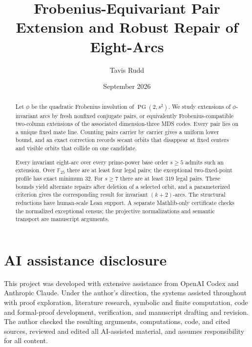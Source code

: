 \documentclass[11pt]{article}
\title{Frobenius-Equivariant Pair Extension and Robust Repair of
Eight-Arcs}
\author{Tavis Rudd}
\date{September 2026}
\theoremstyle{definition}
\theoremstyle{remark}
\newcommand{\PG}{\operatorname{PG}}
\newcommand{\F}{\mathbb{F}}
\begin{document}
\maketitle

\begin{abstract}
Let $\phi$ be the quadratic Frobenius involution of $\PG(2,s^2)$.  We study
extensions of $\phi$-invariant arcs by fresh nonfixed conjugate pairs, or
equivalently Frobenius-compatible two-column extensions of the associated
dimension-three MDS codes.  Every pair lies on a unique fixed mate line.
Counting pairs carrier by carrier gives a uniform lower bound, and an exact
correction records secant orbits that disappear at fixed centers and visible
orbits that collide on one candidate.

Every invariant eight-arc over every prime-power base order $s\ge5$ admits
such an extension.  Over $\F_{25}$ there are at least four legal pairs; the
exceptional two-fixed-point profile has exact minimum $32$.  For $s\ge7$
there are at least $319$ legal pairs.  These bounds yield alternate repairs
after deletion of a selected orbit, and a parameterized criterion gives the
corresponding result for invariant $(k+2)$-arcs.  The structural reductions
have human-scale Lean support.  A separate Mathlib-only certificate checks
the normalized exceptional census; the projective normalizations and
semantic transport are manuscript arguments.
\end{abstract}










\section*{AI assistance disclosure}

This project was developed with extensive assistance from OpenAI Codex and
Anthropic Claude. Under the author's direction, the systems assisted
throughout with proof exploration, literature research, symbolic and finite
computation, code and formal-proof development, verification, and manuscript
drafting and revision. The author checked the resulting arguments,
computations, code, and cited sources, reviewed and edited all AI-assisted
material, and assumes responsibility for all content.



\end{document}
